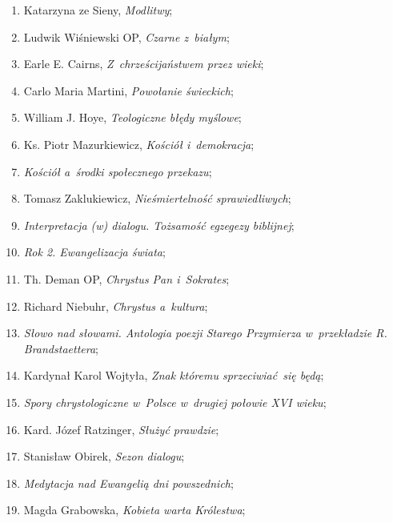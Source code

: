 \documentclass[a4paper,11pt]{article}
\begin{document}
\begin{enumerate}
\item Katarzyna ze Sieny, \textit{Modlitwy};

\item Ludwik Wiśniewski OP, \textit{Czarne z~białym};

\item Earle E. Cairns, \textit{Z~chrześcijaństwem przez wieki};

\item Carlo Maria Martini, \textit{Powołanie świeckich};

\item William J. Hoye, \textit{Teologiczne błędy myślowe};

\item Ks. Piotr Mazurkiewicz, \textit{Kościół i~demokracja};

\item \textit{Kościół a~środki społecznego przekazu};

\item Tomasz Zaklukiewicz, \textit{Nieśmiertelność sprawiedliwych};

\item \textit{Interpretacja (w) dialogu. Tożsamość egzegezy biblijnej};

\item \textit{Rok 2. Ewangelizacja świata};

\item Th. Deman OP, \textit{Chrystus Pan i~Sokrates};

\item Richard Niebuhr, \textit{Chrystus a~kultura};

\item \textit{Słowo nad słowami. Antologia poezji Starego Przymierza
    w~przekładzie R. Brandstaettera};

\item Kardynał Karol Wojtyła, \textit{Znak któremu sprzeciwiać~się będą};

\item \textit{Spory chrystologiczne w~Polsce w~drugiej połowie XVI wieku};

\item Kard. Józef Ratzinger, \textit{Służyć prawdzie};

\item Stanisław Obirek, \textit{Sezon dialogu};

\item \textit{Medytacja nad Ewangelią dni powszednich};

\item Magda Grabowska, \textit{Kobieta warta Królestwa};


\end{enumerate}
\end{document}
